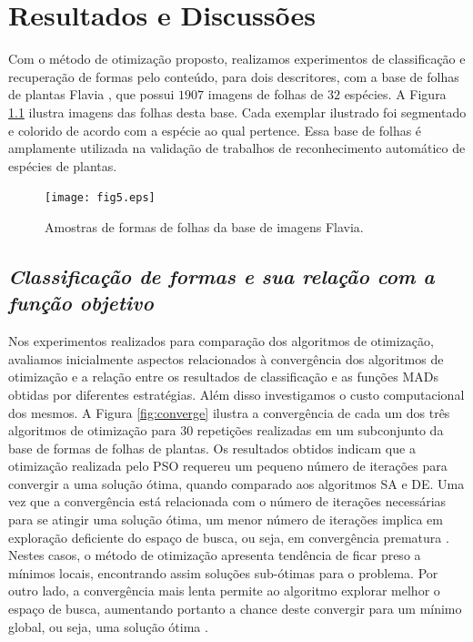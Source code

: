 
\chapter{Resultados e Discussões \label{chap:resultados}}


Com o método de otimização proposto, realizamos experimentos de classificação e recuperação de formas pelo conteúdo, para dois descritores, com a base de folhas de plantas Flavia \cite{4458016},  que possui $1907$ imagens de folhas de $32$ espécies. A Figura \ref{fig:bases} ilustra imagens das folhas desta base. Cada exemplar ilustrado foi segmentado e colorido de acordo com a espécie ao qual pertence. Essa base de folhas é amplamente utilizada na validação de trabalhos de reconhecimento automático de espécies de plantas. 

\begin{figure}[!htb]
\caption{\label{fig:bases}Amostras de formas de folhas da base de imagens Flavia.}

\centering
\texttt{[image: fig5.eps]}
\end{figure}




\section{\emph{Classificação de formas e sua relação com  a função objetivo}}
Nos experimentos realizados para comparação dos algoritmos de otimização, avaliamos inicialmente aspectos  relacionados à  convergência dos algoritmos de otimização e a relação entre os resultados de classificação e as funções \ac{MAD}s obtidas por diferentes estratégias. Além disso investigamos o custo computacional dos mesmos. A Figura \ref{fig:converge} ilustra a convergência de cada um dos três algoritmos de otimização para $30$ repetições realizadas em um subconjunto da base de formas de folhas de plantas. Os resultados obtidos indicam que a otimização realizada pelo \ac{PSO} requereu um pequeno número de iterações para convergir a uma solução ótima, quando comparado aos algoritmos \ac{SA} e \ac{DE}. Uma vez que a convergência está relacionada com o número de iterações necessárias para se atingir uma solução ótima, um menor número de iterações implica em exploração deficiente do espaço de busca, ou seja, em convergência prematura . Nestes casos, o método de otimização apresenta tendência de ficar preso a mínimos locais, encontrando assim soluções sub-ótimas para o problema. Por outro lado, a convergência mais lenta permite ao algoritmo explorar melhor o espaço de busca, aumentando portanto a chance deste convergir para um mínimo global, ou seja, uma solução ótima .
 
